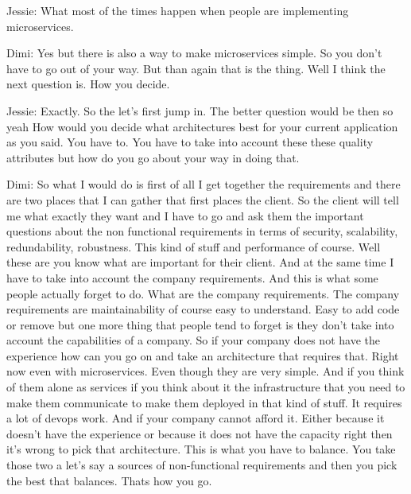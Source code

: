 Jessie: What most of the times happen when people are implementing microservices.

Dimi: Yes but there is also a way to make microservices simple. So you don't have to go out of your way. But than again that is the thing. Well I think the next question is. How you decide.

Jessie: Exactly. So the let's first jump in. The better question would be then so yeah How would you decide what architectures best for your current application as you said. You have to. You have to take into account these these quality attributes but how do you go about your way in doing that.

Dimi: So what I would do is first of all I get together the requirements and there are two places that I can gather that first places the client. So the client will tell me what exactly they want and I have to go and ask them the important questions about the non functional requirements in terms of security, scalability, redundability, robustness. This kind of stuff and performance of course. Well these are you know what are important for their client. And at the same time I have to take into account the company requirements. And this is what some people actually forget to do. What are the company requirements. The company requirements are maintainability of course easy to understand. Easy to add code or remove but one more thing that people tend to forget is they don't take into account the capabilities of a company. So if your company does not have the experience how can you go on and take an architecture that requires that. Right now even with microservices. Even though they are very simple. And if you think of them alone as services if you think about it the infrastructure that you need to make them communicate to make them deployed in that kind of stuff. It requires a lot of devops work. And if your company cannot afford it. Either because it doesn't have the experience or because it does not have the capacity right then it's wrong to pick that architecture. This is what you have to balance. You take those two a let's say a sources of non-functional requirements and then you pick the best that balances. Thats how you go.

